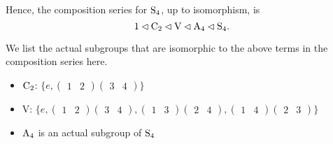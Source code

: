 \begin{questions}
    Hence, the composition series for $\mathrm{S}_{4}$, up to isomorphism, is
    \[
        1 \lhd \mathrm{C}_{2} \lhd \mathrm{V} \lhd \mathrm{A}_{4} \lhd \mathrm{S}_{4}.
    \]
    \begin{remark}
        We list the actual subgroups that are isomorphic to the above terms in the composition series here.
        \begin{itemize}
            \item $\mathrm{C}_{2}$: $\{e, \begin{pmatrix}1&2\end{pmatrix}\begin{pmatrix}3&4\end{pmatrix}\}$
            \item V: $\{e, \begin{pmatrix}1&2\end{pmatrix}\begin{pmatrix}3&4\end{pmatrix}, \begin{pmatrix}1&3\end{pmatrix}\begin{pmatrix}2&4\end{pmatrix}, \begin{pmatrix}1&4\end{pmatrix}\begin{pmatrix}2&3\end{pmatrix}\}$
            \item $\mathrm{A}_{4}$ is an actual subgroup of $\mathrm{S}_{4}$
        \end{itemize}
    \end{remark}
\end{questions}
